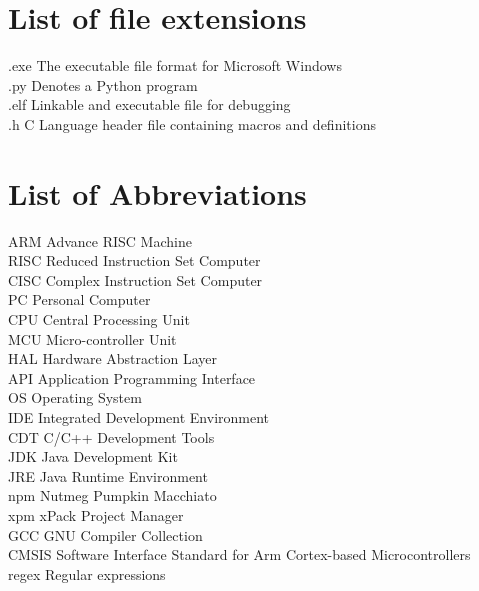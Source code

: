 \listoffigures
\newpage\cleardoublepage

\listoftables


\chapter*{List of file extensions}
\label{listExt}
.exe \Dotfill The executable file format for Microsoft Windows
\\
.py \Dotfill Denotes a Python program
\\
.elf \Dotfill Linkable and executable file for debugging 
\\
.h \Dotfill C Language header file containing macros and definitions
\\

\newpage\cleardoublepage

\chapter*{List of Abbreviations}
\label{listAbr}
ARM \Dotfill Advance RISC Machine
\\
RISC \Dotfill Reduced Instruction Set Computer 
\\
CISC \Dotfill Complex Instruction Set Computer 
\\
PC \Dotfill Personal Computer
\\
CPU \Dotfill Central Processing Unit
\\
MCU \Dotfill Micro-controller Unit
\\
HAL \Dotfill Hardware Abstraction Layer
\\
API \Dotfill Application Programming Interface
\\
OS \Dotfill Operating System
\\
IDE \Dotfill Integrated Development Environment 
\\
CDT \Dotfill C/C++ Development Tools
\\
JDK \Dotfill Java Development Kit 
\\
JRE \Dotfill Java Runtime Environment
\\
npm \Dotfill Nutmeg Pumpkin Macchiato 
\\
xpm \Dotfill xPack Project Manager
\\
GCC \Dotfill GNU Compiler Collection
\\
CMSIS \Dotfill Software Interface Standard for Arm Cortex-based Microcontrollers
\\
regex \Dotfill Regular expressions




\newpage\cleardoublepage